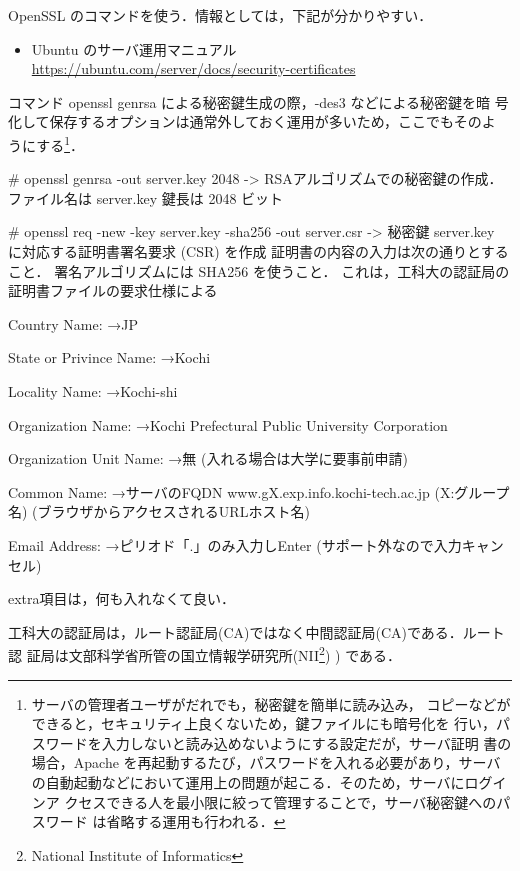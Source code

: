 OpenSSL のコマンドを使う．情報としては，下記が分かりやすい．
\begin{itemize}
 \item Ubuntu のサーバ運用マニュアル\\
 \url{https://ubuntu.com/server/docs/security-certificates}
\end{itemize}

コマンド openssl genrsa による秘密鍵生成の際，-des3 などによる秘密鍵を暗
号化して保存するオプションは通常外しておく運用が多いため，ここでもそのよ
うにする\footnote{サーバの管理者ユーザがだれでも，秘密鍵を簡単に読み込み，
コピーなどができると，セキュリティ上良くないため，鍵ファイルにも暗号化を
行い，パスワードを入力しないと読み込めないようにする設定だが，サーバ証明
書の場合，Apache を再起動するたび，パスワードを入れる必要があり，サーバ
の自動起動などにおいて運用上の問題が起こる．そのため，サーバにログインア
クセスできる人を最小限に絞って管理することで，サーバ秘密鍵へのパスワード
は省略する運用も行われる．}．

\begin{cli}
# openssl genrsa -out server.key 2048
-> RSAアルゴリズムでの秘密鍵の作成．ファイル名は server.key 鍵長は 2048 ビット

# openssl req -new -key server.key -sha256 -out server.csr
-> 秘密鍵 server.key に対応する証明書署名要求 (CSR) を作成
  証明書の内容の入力は次の通りとすること．
  署名アルゴリズムには SHA256 を使うこと．
  これは，工科大の認証局の証明書ファイルの要求仕様による

Country Name:
→JP

State or Privince Name:
→Kochi

Locality Name:
→Kochi-shi

Organization Name:
→Kochi Prefectural Public University Corporation

Organization Unit Name:
→無
(入れる場合は大学に要事前申請)

Common Name:
→サーバのFQDN
   www.gX.exp.info.kochi-tech.ac.jp
   (X:グループ名)
  (ブラウザからアクセスされるURLホスト名)

Email Address:
→ピリオド「.」のみ入力しEnter
 (サポート外なので入力キャンセル)

extra項目は，何も入れなくて良い．

\end{cli}

工科大の認証局は，ルート認証局(CA)ではなく中間認証局(CA)である．ルート認
証局は文部科学省所管の国立情報学研究所(NII\footnote{National Institute 
of Informatics}) ) である．

